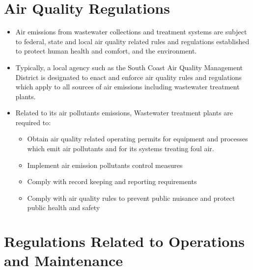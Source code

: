 \section{Air Quality Regulations}
\begin{itemize}
\item Air emissions from wastewater collections and treatment systems are subject to federal, state and local air quality related rules and regulations established to protect human health and comfort, and the environment.  
\item Typically, a local agency such as the South Coast Air Quality Management District is designated to enact and enforce air quality rules and regulations which apply to all sources of air emissions including wastewater treatment plants.
  
\item Related to its air pollutants emissions, Wastewater treatment plants are required to:
\begin{itemize}
\item Obtain air quality related operating permits for equipment and processes which emit air pollutants and for its systems treating foul air.
\item Implement air emission pollutants control measures
\item Comply with record keeping and reporting requirements
\item Comply with air quality rules to prevent public nuisance and protect public health and safety
\end{itemize}

\end{itemize}

\section{Regulations Related to Operations and Maintenance}
